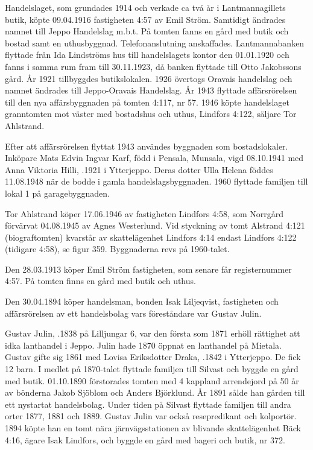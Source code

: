 


Handelslaget, som grundades 1914 och verkade ca två år i Lantmannagillets butik, köpte 09.04.1916 fastigheten 4:57 av Emil Ström.	Samtidigt ändrades namnet till Jeppo Handelslag m.b.t. På tomten fanns en gård med butik och bostad samt en uthusbyggnad. Telefonanslutning anskaffades. Lantmannabanken flyttade från Ida Lindströms	hus till handelslagets kontor den 01.01.1920 och fanns i samma rum fram	till 30.11.1923, då banken flyttade till Otto Jakobssons gård. År 1921 	tillbyggdes butikslokalen. 1926 övertogs Oravais handelslag och	namnet ändrades till Jeppo-Oravais Handelslag. År 1943 flyttade affärsrörelsen till den nya affärsbyggnaden på tomten 4:117, nr 57.	1946 köpte handelslaget granntomten mot väster med bostadshus och uthus, Lindfors 4:122, säljare Tor Ahlstrand.

Efter att affärsrörelsen flyttat 1943 användes byggnaden som bostadslokaler. Inköpare Mats Edvin Ingvar Karf, född i Pensala, Munsala, vigd 08.10.1941 med Anna Viktoria Hilli, .1921 i Ytterjeppo. Deras dotter Ulla Helena föddes 11.08.1948 när de bodde i 	gamla handelslagsbyggnaden. 1960 flyttade familjen till lokal 1 på 	garagebyggnaden.


Tor Ahlstrand köper 17.06.1946 av  fastigheten Lindfors 4:58, som Norrgård förvärvat 04.08.1945 av Agnes Westerlund.	Vid styckning av tomt Alstrand 4:121 (biograftomten) kvarstår av skattelägenhet Lindfors 4:14 endast Lindfors 4:122 (tidigare 4:58), se figur 359. Byggnaderna revs på 1960-talet.


Den 28.03.1913 köper Emil Ström fastigheten, som senare får	registernummer 4:57. På tomten finns en gård med butik och uthus.\jhvspace{}


Den 30.04.1894 köper handelsman, bonden Isak Liljeqvist, fastigheten och affärsrörelsen av ett handelsbolag vars föreståndare var Gustav Julin.\jhvspace{}


Gustav Julin, .1838 på Lilljungar 6, var den första som	1871 erhöll rättighet att idka lanthandel i Jeppo. Julin hade 1870 öppnat en lanthandel på Mietala. Gustav gifte sig 1861 med Lovisa Eriksdotter Draka, .1842 i Ytterjeppo. De fick 12 barn. I medlet på 1870-talet flyttade familjen till Silvast och byggde en gård med butik. 01.10.1890 förstorades tomten med 4 kappland arrendejord på 50 år av bönderna Jakob Sjöblom och Anders Björklund. År 1891 sålde han gården till ett nystartat handelsbolag. Under tiden på Silvast flyttade familjen till andra orter 1877, 1881 och 1889. Gustav Julin var också resepredikant och kolportör. 1894 köpte han en tomt nära järnvägsstationen av blivande skattelägenhet Bäck 4:16, ägare Isak Lindfors, och byggde en gård med bageri och butik, nr 372.



